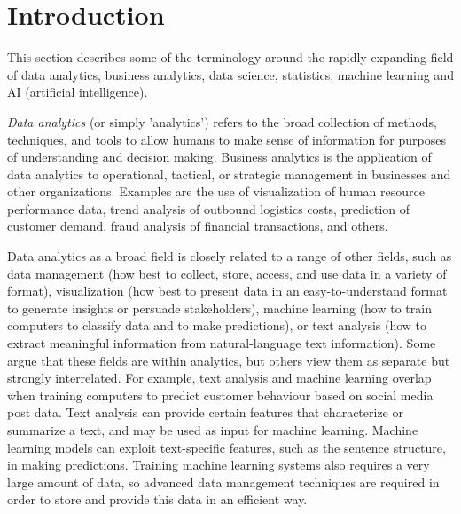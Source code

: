 %
%


\section{Introduction}

This section describes some of the terminology around the rapidly expanding field of data analytics, business analytics, data science, statistics, machine learning and AI (artificial intelligence). 

\emph{Data analytics} (or simply 'analytics') refers to the broad collection of methods, techniques, and tools to allow humans to make sense of information for purposes of understanding and decision making. Business analytics is the application of data analytics to operational, tactical, or strategic management in businesses and other organizations. Examples are the use of visualization of human resource performance data, trend analysis of outbound logistics costs, prediction of customer demand, fraud analysis of financial transactions, and others.

Data analytics as a broad field is closely related to a range of other fields, such as data management (how best to collect, store, access, and use data in a variety of format), visualization (how best to present data in an easy-to-understand format to generate insights or persuade stakeholders), machine learning (how to train computers to classify data and to make predictions), or text analysis (how to extract meaningful information from natural-language text information). Some argue that these fields are within analytics, but others view them as separate but strongly interrelated. For example, text analysis and machine learning overlap when training computers to predict customer behaviour based on social media post data. Text analysis can provide certain features that characterize or summarize a text, and may be used as input for machine learning. Machine learning models can exploit text-specific features, such as the sentence structure, in making predictions. Training machine learning systems also requires a very large amount of data, so advanced data management techniques are required in order to store and provide this data in an efficient way. 

